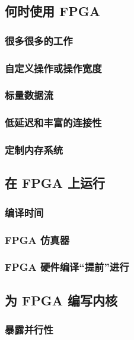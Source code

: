 \subsection{何时使用 FPGA}

\subsubsection{很多很多的工作}

\subsubsection{自定义操作或操作宽度}

\subsubsection{标量数据流}

\subsubsection{低延迟和丰富的连接性}

\subsubsection{定制内存系统}

\subsection{在 FPGA 上运行}

\subsubsection{编译时间}

\subsubsection{FPGA 仿真器}

\subsubsection{FPGA 硬件编译“提前”进行}

\subsection{为 FPGA 编写内核}

\subsubsection{暴露并行性}

